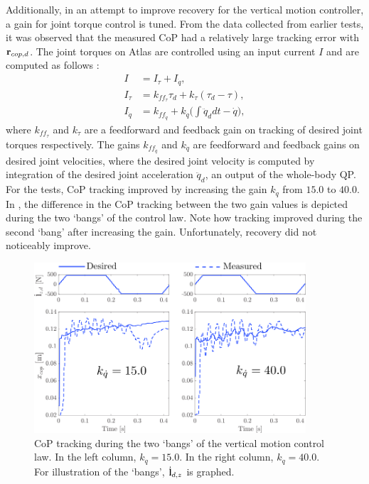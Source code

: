Additionally, in an attempt to improve recovery for the vertical motion controller, a gain for joint torque control is tuned. From the data collected from earlier tests, it was observed that the measured \ac{CoP} had a relatively large tracking error with $\mathbf{r}_{cop,d}$. The joint torques on Atlas are controlled using an input current $I$ and are computed as follows \cite{koolen2016design}:
\begin{align}
	I &= I_{\tau} + I_{\dot{q}},\\
	I_{\tau} &= k_{ff_{\tau}}\tau_{d} + k_{\tau}(\tau_{d} - \tau),\\
	I_{\dot{q}} &= k_{ff_{\dot{q}}} + k_{\dot{q}}\bigg(\int \ddot{q}_d dt - \dot{q} \bigg),
\end{align}
where $k_{ff_{\tau}}$ and $k_{\tau}$ are a feedforward and feedback gain on tracking of desired joint torques respectively. The gains $k_{ff_{\dot{q}}}$ and $k_{\dot{q}}$ are feedforward and feedback gains on desired joint velocities, where the desired joint velocity is computed by integration of the desired joint acceleration $\ddot{q}_d$, an output of the whole-body \ac{QP}. For the tests, \ac{CoP} tracking improved by increasing the gain $k_{\dot{q}}$ from $15.0$ to $40.0$. In , the difference in the \ac{CoP} tracking between the two gain values is depicted during the two `bangs' of the control law. Note how tracking improved during the second `bang' after increasing the gain. Unfortunately, recovery did not noticeably improve.

\begin{figure}
\centering
\includegraphics[width=0.9\textwidth]{STYLESTUFF/atlascop.png}
\caption{\ac{CoP} tracking during the two `bangs' of the vertical motion control law. In the left column, $k_{\dot{q}}=15.0$. In the right column, $k_{\dot{q}}=40.0$. For illustration of the `bangs', $\dot{\mathbf{l}}_{d,z}$ is graphed. }
\label{fig:atlascop}
\end{figure}

